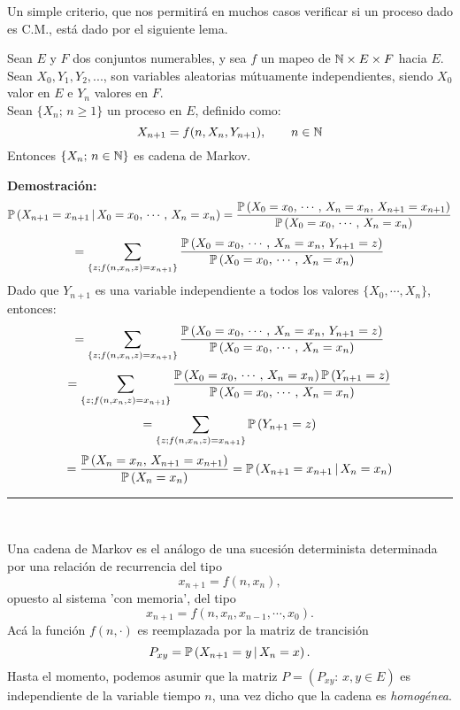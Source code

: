 Un simple criterio, que nos permitirá en muchos casos verificar si un proceso dado es C.M., está dado por el siguiente lema.

\begin{lem}
Sean $E$ y $F$ dos conjuntos numerables, y sea $f$ un mapeo de $\mathbb N\times E \times F$ hacia $E$. Sean $X_0,Y_1,Y_2,...$, son variables aleatorias mútuamente independientes, siendo $X_0$ valor en $E$ e $Y_n$ valores en $F$.\\ 
Sean $\{X_n;\,n\geq 1\}$ un proceso en $E$, definido como:
\[X_{n+1} = f(n,X_n,Y_{n+1}),\hspace{0.7cm}n\in\mathbb N\]
Entonces $\{X_n;\,n\in\mathbb N\}$ es cadena de Markov.
\end{lem}

\textbf{Demostración: }
\[\mathbb{P}\left(X_{n+1} = x_{n+1}\,|\,X_0=x_0,\,\cdots,\,X_n=x_n\right) = \frac{\mathbb{P}\left(X_0=x_0,\,\cdots,\,X_n=x_n,\,X_{n+1}=x_{n+1}\right)}{\mathbb{P}\left(X_0=x_0,\,\cdots,\,X_n=x_n\right)}\]
\[ = \sum_{\{z;f(n,x_n,z)=x_{n+1}\}}\frac{\mathbb{P}\left(X_0=x_0,\,\cdots,\,X_n=x_n,\,Y_{n+1}=z\right)}{\mathbb{P}\left(X_0=x_0,\,\cdots,\,X_n=x_n\right)}\]
Dado que $Y_{n+1}$ es una variable independiente a todos los valores $\{X_0,\cdots,X_n\}$, entonces:
\[ = \sum_{\{z;f(n,x_n,z)=x_{n+1}\}}\frac{\mathbb{P}\left(X_0=x_0,\,\cdots,\,X_n=x_n,\,Y_{n+1}=z\right)}{\mathbb{P}\left(X_0=x_0,\,\cdots,\,X_n=x_n\right)}\]
\[ = \sum_{\{z;f(n,x_n,z)=x_{n+1}\}}\frac{\mathbb{P}\left(X_0=x_0,\,\cdots,\,X_n=x_n\right)\mathbb{P}\left(Y_{n+1}=z\right)}{\mathbb{P}\left(X_0=x_0,\,\cdots,\,X_n=x_n\right)}\]
\[ = \sum_{\{z;f(n,x_n,z)=x_{n+1}\}}\mathbb{P}\left(Y_{n+1}=z\right)\]
\[=\frac{\mathbb{P}\left(X_n = x_n,\,X_{n+1}=x_{n+1}\right)}{\mathbb{P}\left(X_n =x_n\right)} = \mathbb{P}\left(X_{n+1}=x_{n+1}\,|\,X_n=x_n\right)\]
\rule{0.7em}{0.7em}\\ \newline

Una cadena de Markov es el análogo de una sucesión determinista determinada por una relación de recurrencia del tipo
\[x_{n+1} = f(n,x_n),\]
opuesto al sistema 'con memoria', del tipo
\[x_{n+1} = f(n,x_n,x_{n-1},\cdots,x_0).\]
Acá la función $f(n,\cdot)$ es reemplazada por la matriz de trancisión
\[P_{xy}= \mathbb{P}\left(X_{n+1}=y\,|\,X_n =x\right).\]
Hasta el momento, podemos asumir que la matriz $P=\left(P_{xy}:\,x,y\in E\right)$ es independiente de la variable tiempo $n$, una vez dicho que la cadena es \textit{homogénea}.

